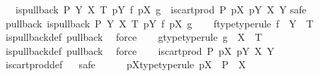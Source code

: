\begin{isabellebody}
\ \ \ {\isachardoublequoteopen}{\isacharparenleft}{\kern0pt}is{\isacharunderscore}{\kern0pt}pullback\ P\ Y\ X\ T\ {\isacharparenleft}{\kern0pt}pY{\isacharparenright}{\kern0pt}\ f\ {\isacharparenleft}{\kern0pt}pX{\isacharparenright}{\kern0pt}\ g{\isacharparenright}{\kern0pt}\ {\isacharequal}{\kern0pt}\ {\isacharparenleft}{\kern0pt}is{\isacharunderscore}{\kern0pt}cart{\isacharunderscore}{\kern0pt}prod\ P\ pX\ pY\ X\ Y{\isacharparenright}{\kern0pt}{\isachardoublequoteclose}\isanewline
%
\isadelimproof
%
\endisadelimproof
%
\isatagproof
{}\isamarkupfalse%
{\isacharparenleft}{\kern0pt}safe{\isacharparenright}{\kern0pt}\isanewline
\ \ \isamarkupfalse%
\ pullback{\isacharcolon}{\kern0pt}\ {\isachardoublequoteopen}is{\isacharunderscore}{\kern0pt}pullback\ P\ Y\ X\ T\ pY\ f\ pX\ g{\isachardoublequoteclose}\isanewline
\ \ \isamarkupfalse%
\ f{\isacharunderscore}{\kern0pt}type{\isacharbrackleft}{\kern0pt}type{\isacharunderscore}{\kern0pt}rule{\isacharbrackright}{\kern0pt}{\isacharcolon}{\kern0pt}\ {\isachardoublequoteopen}f\ {\isacharcolon}{\kern0pt}\ Y\ {\isasymrightarrow}\ T{\isachardoublequoteclose}\isanewline
\ \ \ \ \isamarkupfalse%
\ is{\isacharunderscore}{\kern0pt}pullback{\isacharunderscore}{\kern0pt}def\ pullback\ \isamarkupfalse%
\ force\isanewline
\ \ \isamarkupfalse%
\ g{\isacharunderscore}{\kern0pt}type{\isacharbrackleft}{\kern0pt}type{\isacharunderscore}{\kern0pt}rule{\isacharbrackright}{\kern0pt}{\isacharcolon}{\kern0pt}\ {\isachardoublequoteopen}g\ {\isacharcolon}{\kern0pt}\ X\ {\isasymrightarrow}\ T{\isachardoublequoteclose}\isanewline
\ \ \ \ \isamarkupfalse%
\ is{\isacharunderscore}{\kern0pt}pullback{\isacharunderscore}{\kern0pt}def\ pullback\ \isamarkupfalse%
\ force\isanewline
\ \ \isamarkupfalse%
\ {\isachardoublequoteopen}is{\isacharunderscore}{\kern0pt}cart{\isacharunderscore}{\kern0pt}prod\ P\ pX\ pY\ X\ Y{\isachardoublequoteclose}\isanewline
\ \ \ \ \isamarkupfalse%
\ is{\isacharunderscore}{\kern0pt}cart{\isacharunderscore}{\kern0pt}prod{\isacharunderscore}{\kern0pt}def\isanewline
\ \ \isamarkupfalse%
{\isacharparenleft}{\kern0pt}safe{\isacharparenright}{\kern0pt}\isanewline
\ \ \ \ \isamarkupfalse%
\ pX{\isacharunderscore}{\kern0pt}type{\isacharbrackleft}{\kern0pt}type{\isacharunderscore}{\kern0pt}rule{\isacharbrackright}{\kern0pt}{\isacharcolon}{\kern0pt}\ {\isachardoublequoteopen}pX\ {\isacharcolon}{\kern0pt}\ P\ {\isasymrightarrow}\ X{\isachardoublequoteclose}\isanewline

\end{isabellebody}
